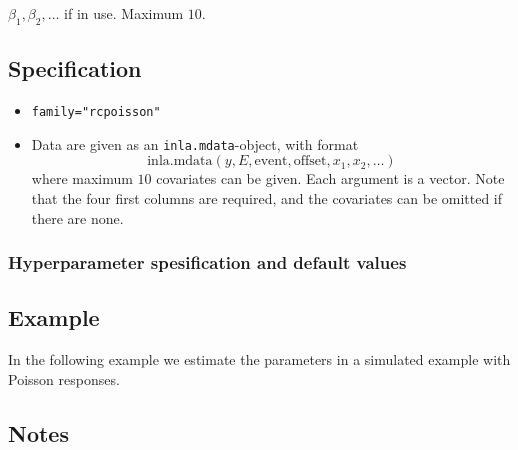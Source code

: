 \documentclass[a4paper,11pt]{article}
\begin{document}
$\beta_1, \beta_2, \ldots$ if in use. Maximum $10$. 

\subsection*{Specification}

\begin{itemize}
\item \texttt{family="rcpoisson"}
\item Data are given as an \texttt{inla.mdata}-object, with format
    \begin{displaymath}
        \text{inla.mdata}(y, E, \text{event}, \text{offset}, x_1,
        x_2, \ldots)
    \end{displaymath}
    where maximum $10$ covariates can be given. Each argument is a
    vector. Note that the four first columns are required, and the
    covariates can be omitted if there are none.
\end{itemize}

\subsubsection*{Hyperparameter spesification and default values}


\subsection*{Example}

In the following example we estimate the parameters in a simulated
example with Poisson responses.


\subsection*{Notes}
\end{document}
